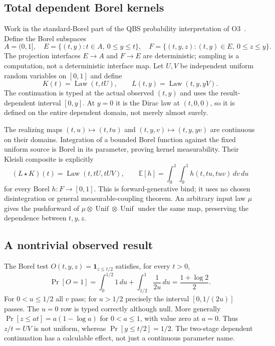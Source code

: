 \documentclass[11pt,a4paper]{article}
\theoremstyle{definition}
\newcommand{\Law}{\operatorname{Law}}
\begin{document}
\subsection{Total dependent Borel kernels}
Work in the standard-Borel part of the QBS probability interpretation
of O3~\cite{O3}. Define the Borel subspaces
\[
A=(0,1],\quad E=\{(t,y):t\in A,\ 0\leq y\leq t\},\quad
F=\{(t,y,z):(t,y)\in E,\ 0\leq z\leq y\}.
\]
The projection interfaces $E\to A$ and $F\to E$ are deterministic;
sampling is a computation, not a deterministic interface map. Let
$U,V$ be independent uniform random variables on $[0,1]$ and define
\[
K(t)=\Law(t,tU),\qquad L(t,y)=\Law(t,y,yV).
\]
The continuation is typed at the actual observed $(t,y)$ and uses the
result-dependent interval $[0,y]$. At $y=0$ it is the Dirac law at
$(t,0,0)$, so it is defined on the entire dependent domain, not merely
almost surely.

The realizing maps $(t,u)\mapsto(t,tu)$ and
$(t,y,v)\mapsto(t,y,yv)$ are continuous on their domains. Integration
of a bounded Borel function against the fixed uniform source is Borel
in its parameter, proving kernel measurability. Their Kleisli composite
is explicitly
\begin{equation}\label{eq:E-bind}
(L\star K)(t)=\Law(t,tU,tUV),\qquad
\mathbb E[h]=\int_0^1\int_0^1 h(t,tu,tuv)\,dv\,du
\end{equation}
for every Borel $h:F\to[0,1]$. This is forward-generative bind; it uses
no chosen disintegration or general measurable-coupling theorem. An
arbitrary input law $\mu$ gives the pushforward of
$\mu\otimes\operatorname{Unif}\otimes\operatorname{Unif}$ under the
same map, preserving the dependence between $t,y,z$.

\subsection{A nontrivial observed result}
The Borel test $O(t,y,z)=\mathbf1_{z\leq t/2}$ satisfies, for every
$t>0$,
\begin{equation}\label{eq:E-observation}
\Pr[O=1]=\int_0^{1/2}1\,du+
\int_{1/2}^1\frac{1}{2u}\,du=\frac{1+\log2}{2}.
\end{equation}
For $0<u\leq1/2$ all $v$ pass; for $u>1/2$ precisely the interval
$[0,1/(2u)]$ passes. The $u=0$ row is typed correctly although null.
More generally $\Pr[z\leq at]=a(1-\log a)$ for $0<a\leq1$, with
value zero at $a=0$. Thus $z/t=UV$ is not uniform, whereas
$\Pr[y\leq t/2]=1/2$. The two-stage dependent continuation has a
calculable effect, not just a continuous parameter name.
\end{document}

